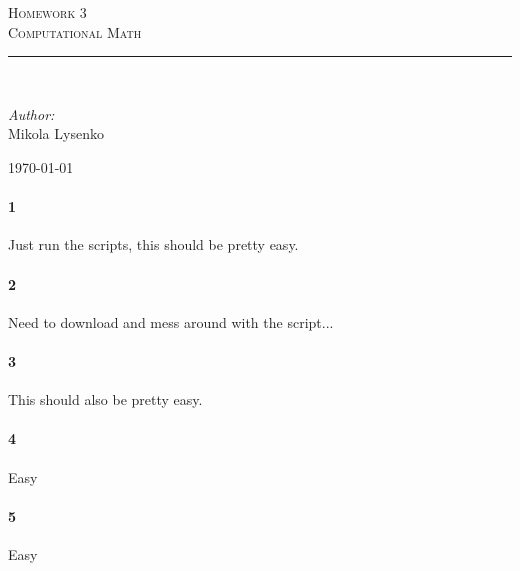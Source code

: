 \documentclass{article}
\newcommand{\HRule}{\rule{\linewidth}{0.5mm}}
\begin{document}
\begin{titlepage}
 
\begin{center}
 
\textsc{\LARGE Homework 3}\\[1.5cm] 

\textsc{\Large Computational Math}\\[0.5cm]
 
 
\HRule \\[2cm]
 
\begin{minipage}{0.4\textwidth}
\begin{flushleft} \large
\emph{Author:}\\
Mikola Lysenko
\end{flushleft}
\end{minipage}
 
\vfill
 
{\large \today}
 
\end{center}
 
\end{titlepage}

\paragraph{1}

Just run the scripts, this should be pretty easy.

\paragraph{2}

Need to download and mess around with the script...

\paragraph{3}

This should also be pretty easy.

\paragraph{4}

Easy

\paragraph{5}

Easy
\end{document}
